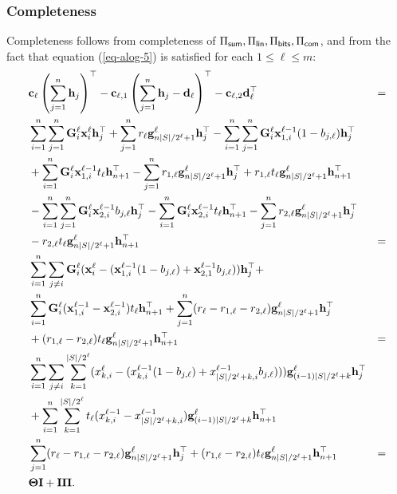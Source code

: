 \subsubsection{Completeness}
Completeness follows from completeness of $\Pi_{\mathsf{sum}},\Pi_\mathsf{lin},\Pi_{\mathsf{bits}},\Pi_{\mathsf{com}}$, and from the fact that equation (\ref{eq-alog-5}) is satisfied for each $1\leq\ell\leq m$:
\begin{align*}
&\mathbf{c}_\ell\left(\sum_{j=1}^n \mathbf{h}_j\right)^\top-
\mathbf{c}_{\ell,1}\left(\sum_{j=1}^n\mathbf{h}_j-\mathbf{d}_\ell\right)^\top-
\mathbf{c}_{\ell,2}\mathbf{d}_\ell^\top &= \\
&\sum_{i=1}^n\sum_{j=1}^n\mathbf{{G}}^\ell_i\mathbf{x}^\ell_i\mathbf{h}_j^\top+\sum_{j=1}^nr_\ell\mathbf{g}_{n|S|/2^\ell+1}^\ell\mathbf{h}_j^\top
-\sum_{i=1}^n\sum_{j=1}^n\mathbf{{G}}^\ell_i\mathbf{x}^{\ell-1}_{1,i}(1-b_{j,\ell})\mathbf{h}_j^\top\\
&+\sum_{i=1}^n\mathbf{{G}}^\ell_i\mathbf{x}^{\ell-1}_{1,i} t_\ell\mathbf{h}_{n+1}^\top-\sum_{j=1}^nr_{1,\ell}\mathbf{g}^\ell_{n|S|/2^\ell+1}\mathbf{h}_j^\top+ r_{1,\ell}t_\ell\mathbf{g}^\ell_{n|S|/2^\ell+1}\mathbf{h}_{n+1}^\top\\
&-\sum_{i=1}^n\sum_{j=1}^n\mathbf{{G}}^\ell_i\mathbf{x}^{\ell-1}_{2,i}b_{j,\ell}\mathbf{h}_j^\top-\sum_{i=1}^n\mathbf{{G}}^\ell_i\mathbf{x}^{\ell-1}_{2,i} t_\ell\mathbf{h}_{n+1}^\top-\sum_{j=1}^nr_{2,\ell}\mathbf{g}^\ell_{n|S|/2^\ell+1}\mathbf{h}_j^\top\\
&- r_{2,\ell}t_\ell\mathbf{g}^\ell_{n|S|/2^\ell+1}\mathbf{h}_{n+1}^\top &=\\
&\sum_{i=1}^n\sum_{j\neq i}\mathbf{{G}}^\ell_i(\mathbf{x}^\ell_i-(\mathbf{x}^{\ell-1}_{1,i}(1-b_{j,\ell})+\mathbf{x}^{\ell-1}_{2,1}b_{j,\ell}))\mathbf{h}_j^\top+\\
&\sum_{i=1}^n\mathbf{{G}}^\ell_i(\mathbf{x}^{\ell-1}_{1,i}-\mathbf{x}^{\ell-1}_{2,i})t_\ell\mathbf{h}_{n+1}^\top+\sum_{j=1}^n(r_\ell-r_{1,\ell}-r_{2,\ell})\mathbf{g}_{n|S|/2^\ell+1}^\ell\mathbf{h}_{j}^\top\\
&+(r_{1,\ell}-r_{2,\ell})t_\ell\mathbf{g}^\ell_{n|S|/2^\ell+1}\mathbf{h}_{n+1}^\top &=\\
&\sum_{i=1}^n\sum_{j\neq i}\sum_{k=1}^{|S|/2^\ell}(x_{k,i}^\ell-(x_{k,i}^{\ell-1}(1-b_{j,\ell})+x_{|S|/2^\ell+k,i}^{\ell-1}b_{j,\ell})))\mathbf{g}_{(i-1)|S|/2^\ell+k}^\ell\mathbf{h}_j^\top\\
&+\sum_{i=1}^n\sum_{k=1}^{|S|/2^\ell}t_\ell(x_{k,i}^{\ell-1}-x_{|S|/2^\ell+k,i}^{\ell-1})\mathbf{g}_{(i-1)|S|/2^\ell+k}^\ell\mathbf{h}_{n+1}^\top\\
&\sum_{j=1}^n(r_\ell-r_{1,\ell}-r_{2,\ell})\mathbf{g}_{n|S|/2^\ell+1}^\ell\mathbf{h}_{j}^\top+(r_{1,\ell}-r_{2,\ell})t_\ell\mathbf{g}^\ell_{n|S|/2^\ell+1}\mathbf{h}_{n+1}^\top &=\\
&\mathbf{{\Theta}}\mathbf{{I}}+\mathbf{{I}}\mathbf{{\Pi}}.
\end{align*}

